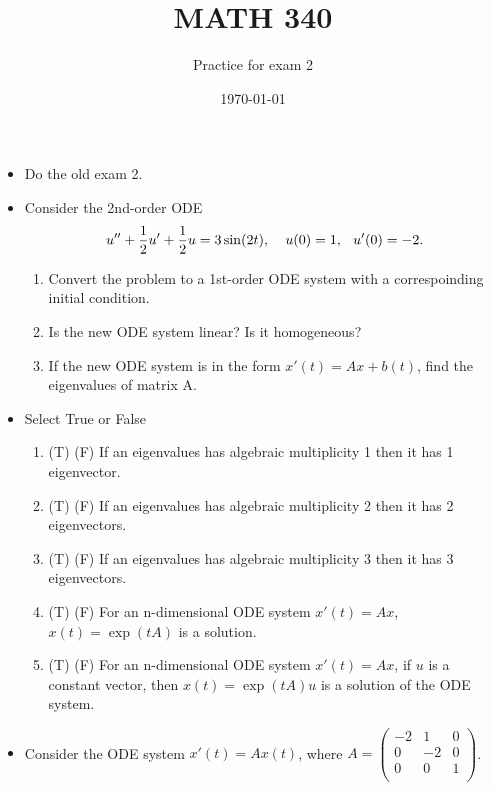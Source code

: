 \documentclass{article}
\begin{document}
\title{MATH 340}
\author{Practice for exam 2}
\date{\today}
\maketitle

\begin{itemize}

\item Do the old exam 2.

\item Consider the 2nd-order ODE
    \[u''+\frac{1}{2}u'+\frac{1}{2}u = 3\sin(2t), \hspace{.15in} u(0)=1,
    \hspace{.1in} u'(0)=-2.\]

\begin{enumerate}
	\item Convert the problem to a 1st-order ODE system with a
		correspoinding initial condition.
	\item Is the new ODE system linear? Is it homogeneous?
	\item If the new ODE system is in the form $x'(t)=Ax+b(t)$, find the
		eigenvalues of matrix A.
\end{enumerate}

\item Select True or False
\begin{enumerate}
	\item (T)  (F) If an eigenvalues has algebraic multiplicity 1 then it has 1 eigenvector.
	\item (T)  (F) If an eigenvalues has algebraic multiplicity 2 then it has 2 eigenvectors.
	\item (T)  (F) If an eigenvalues has algebraic multiplicity 3 then it has 3 eigenvectors.
	\item (T)  (F) For an n-dimensional ODE system $x'(t)=Ax$, $x(t)=\exp(tA)$ is a solution.
	\item (T)  (F) For an n-dimensional ODE system $x'(t)=Ax$, if $u$ is a
		constant vector, then $x(t)=\exp(tA)u$ is a solution of the ODE
		system.
\end{enumerate}

\item Consider the ODE system $x'(t)=Ax(t)$, where $A=\begin{pmatrix}
		-2 &  1 & 0\\
		 0 & -2 & 0\\
		 0 &  0 & 1\\
	\end{pmatrix}$.


\end{itemize}
\end{document}
